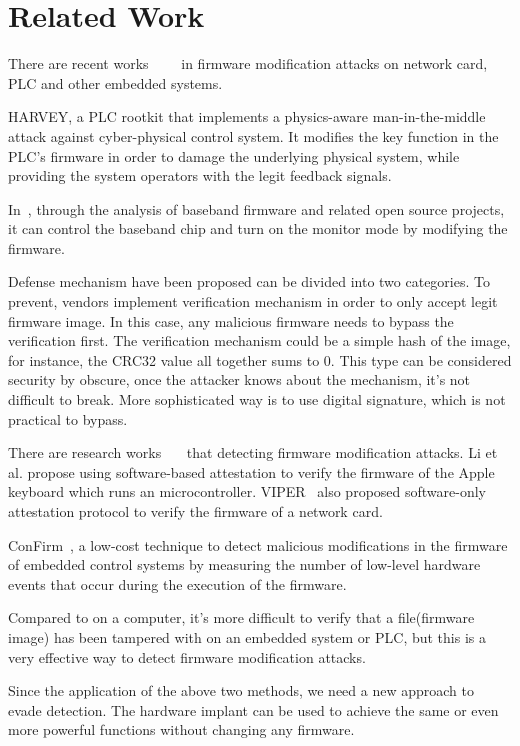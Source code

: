 \section{Related Work}
\label{sec:implant-relatedwork}

There are recent works~\cite{garcia2017hey}~\cite{basnight2013firmware}~\cite{blanco2012one}~\cite{cui2013firmware} in firmware modification attacks on network card, PLC and other embedded systems.

HARVEY, a PLC rootkit that implements a physics-aware man-in-the-middle attack against cyber-physical control system. It modifies the key function in the PLC's firmware in order to damage the underlying physical system, while providing the system operators with the legit feedback signals.

In~\cite{blanco2012one}, through the analysis of baseband firmware and related open source projects, it can control the baseband chip and turn on the monitor mode by modifying the firmware.

Defense mechanism have been proposed can be divided into two categories. To prevent, vendors implement verification mechanism in order to only accept legit firmware image. In this case, any malicious firmware needs to bypass the verification first. The verification mechanism could be a simple hash of the image, for instance, the CRC32 value all together sums to 0. This type can be considered security by obscure, once the attacker knows about the mechanism, it's not difficult to break. More sophisticated way is to use digital signature, which is not practical to bypass. 

There are research works~\cite{li2011viper}~\cite{wang2015confirm}~\cite{li2011viper} that detecting firmware modification attacks. Li et al. propose using software-based attestation to verify the firmware of the Apple keyboard which runs an microcontroller. VIPER~\cite{li2011viper} also proposed software-only attestation protocol to verify the firmware of a network card.

ConFirm~\cite{wang2015confirm}, a low-cost technique to detect malicious modifications in the firmware of embedded control systems by measuring the number of low-level hardware events that occur during the execution of the firmware.

Compared to on a computer, it's more difficult to verify that a file(firmware image) has been tampered with on an embedded system or PLC, but this is a very effective way to detect firmware modification attacks.


Since the application of the above two methods, we need a new approach to evade detection. The hardware implant can be used to achieve the same or even more powerful functions without changing any firmware.
